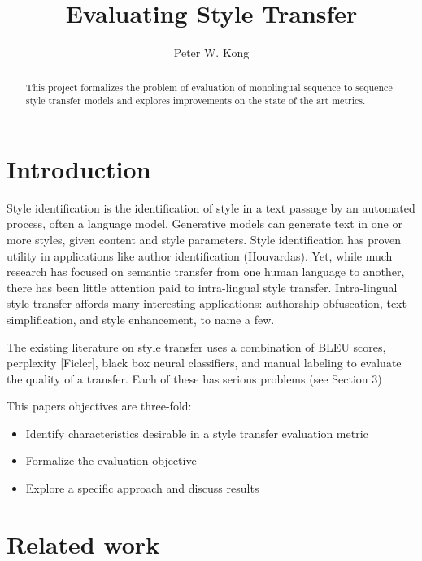 \documentclass[letterpaper, 10 pt, conference]{ieeeconf}  %
\title{\LARGE \bf
Evaluating Style Transfer
}
\author{Peter W. Kong}
\begin{document}
\maketitle
\thispagestyle{empty}
\pagestyle{empty}


\begin{abstract}

This project formalizes the problem of evaluation of monolingual sequence to sequence style transfer models and explores improvements on the state of the art metrics.

\end{abstract}




\section{Introduction}
                
        
Style identification is the identification of style in a text passage by an automated process, often a language model. Generative models can generate text in one or more styles, given content and style parameters. Style identification has proven utility in applications like author identification (Houvardas). Yet, while much research has focused on semantic transfer from one human language to another, there has been little attention paid to intra-lingual style transfer. Intra-lingual style transfer affords many interesting applications: authorship obfuscation, text simplification, and style enhancement, to name a few.

The existing literature on style transfer uses a combination of BLEU scores, perplexity [Ficler], black box neural classifiers, and manual labeling to evaluate the quality of a transfer. Each of these has serious problems (see Section 3)


This paper\textquotesingle s objectives are three-fold:
\begin{itemize}
    \item Identify characteristics desirable in a style transfer evaluation metric
    \item Formalize the evaluation objective
    \item Explore a specific approach and discuss results
\end{itemize}
          

\section{Related work}
\end{document}
